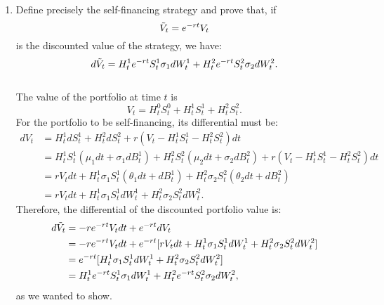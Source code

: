 \documentclass[handout,8pt]{beamer}
\begin{document}
\begin{frame}[allowframebreaks]{ }
\begin{enumerate}
\begin{enumerate}
        \item Define precisely the self-financing strategy and prove that, if
        \begin{equation*}
            \Tilde{V}_t = e^{-rt} V_t
        \end{equation*}
        is the discounted value of the strategy, we have:
        \begin{equation}
            d\Tilde{V}_t = H_t^1 e^{-rt} S_t^1\sigma_1 dW_t^1 + H_t^2 e^{-rt} S_t^2 \sigma_2 dW_t^2.
        \end{equation}\\
        The value of the portfolio at time $t$ is
        \begin{equation*}
            V_t = H_t^0S_t^0 + H_t^1S_t^1 + H_t^2S_t^2.
        \end{equation*}
        For the portfolio to be self-financing, its differential must be:
        \begin{align*}
            dV_t &= H_t^1 dS_t^1 + H_t^2 dS_t^2 + r(V_t - H_t^1S_t^1 - H_t^2S_t^2) dt\\
            &= H_t^1S_t^1(\mu_1 dt + \sigma_1 dB_t^1) + H_t^2S_t^2(\mu_2 dt + \sigma_2 dB_t^2) + r(V_t - H_t^1S_t^1 - H_t^2S_t^2) dt\\
            &= rV_t dt + H_t^1\sigma_1S_t^1(\theta_1 dt + dB_t^1) + H_t^2\sigma_2S_t^2(\theta_2 dt + dB_t^2)\\
            &= rV_t dt + H_t^1\sigma_1S_t^1 dW_t^1 + H_t^2\sigma_2S_t^2 dW_t^2.
        \end{align*}
        Therefore, the differential of the discounted portfolio value is:
        \begin{align*}
            d\Tilde{V}_t &= -re^{-rt}V_t dt + e^{-rt} dV_t\\
            &= -re^{-rt}V_t dt + e^{-rt}[rV_t dt + H_t^1\sigma_1S_t^1 dW_t^1 + H_t^2\sigma_2S_t^2 dW_t^2]\\
            &= e^{-rt}[H_t^1\sigma_1S_t^1 dW_t^1 + H_t^2\sigma_2S_t^2 dW_t^2]\\
            &= H_t^1e^{-rt}S_t^1\sigma_1 dW_t^1 + H_t^2e^{-rt}S_t^2\sigma_2 dW_t^2,
        \end{align*}
        as we wanted to show.
        

\end{enumerate}
\end{enumerate}
\end{frame}
\end{document}
